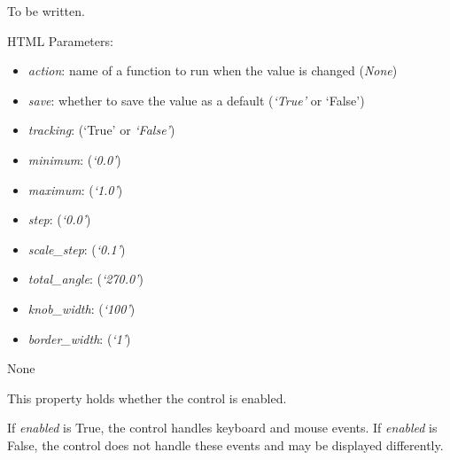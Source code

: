 \documentclass[letterpaper,10pt,english]{sphinxmanual}
\begin{document}
\begin{fulllineitems}
\label{api:qwt.Knob}
To be written.

HTML Parameters:
\begin{itemize}
\item {} 
\emph{action}: name of a function to run when the value is changed (\emph{None})

\item {} 
\emph{save}: whether to save the value as a default (\emph{`True'} or `False')

\item {} 
\emph{tracking}: (`True' or \emph{`False'})

\item {} 
\emph{minimum}: (\emph{`0.0'})

\item {} 
\emph{maximum}: (\emph{`1.0'})

\item {} 
\emph{step}: (\emph{`0.0'})

\item {} 
\emph{scale\_step}: (\emph{`0.1'})

\item {} 
\emph{total\_angle}: (\emph{`270.0'})

\item {} 
\emph{knob\_width}: (\emph{`100'})

\item {} 
\emph{border\_width}: (\emph{`1'})

\end{itemize}

\begin{fulllineitems}
\label{api:qwt.Knob.action}
None

\end{fulllineitems}


\begin{fulllineitems}
\label{api:qwt.Knob.enabled}
This property holds whether the control is enabled.

If \emph{enabled} is True, the control handles keyboard and mouse events.
If \emph{enabled} is False, the control does not handle these events and may
be displayed differently.

\end{fulllineitems}


\end{fulllineitems}
\end{document}
